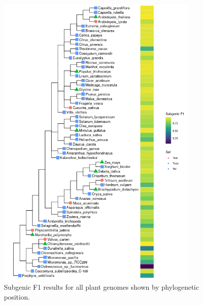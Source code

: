 \documentclass{article}
\renewcommand{\thefigure}{S\arabic{figure}}
\def \tablescale{0.88}
\begin{document}
\clearpage
\begin{figure}[!h]
\label{supfig:phylogeny_f1_plants}
\centerline{\includegraphics[width=\tablescale\textwidth]{images/plants_f1_scores}}
\caption{Subgenic F1 results for all plant genomes shown by phylogenetic position.}
\end{figure}
\end{document}
